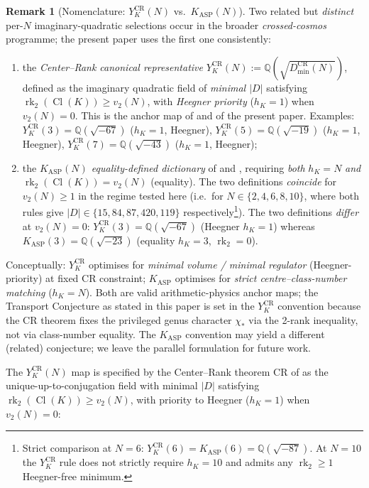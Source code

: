 \documentclass[11pt,a4paper,reqno]{amsart}
\theoremstyle{definition}
\newtheorem{remark}[theorem]{Remark}
\DeclareMathOperator{\Cl}{Cl}
\DeclareMathOperator{\rk}{rk}
\newcommand{\KASP}{K_{\mathrm{ASP}}}
\newcommand{\YKCR}{Y_K^{\mathrm{CR}}}
\newcommand{\QQ}{\mathbb{Q}}
\begin{document}
\begin{remark}[Nomenclature: $\YKCR(N)$ vs.\ $\KASP(N)$]\label{rem:nomen}
Two related but \emph{distinct} per-$N$ imaginary-quadratic selections occur in the broader \emph{crossed-cosmos} programme; the present paper uses the first one consistently:
\begin{enumerate}[label=(\arabic*),leftmargin=2em]
  \item the \emph{Center--Rank canonical representative} $\YKCR(N) := \QQ(\sqrt{D^{\mathrm{CR}}_{\min}(N)})$, defined as the imaginary quadratic field of \emph{minimal $|D|$} satisfying $\rk_2(\Cl(K))\ge v_2(N)$, with \emph{Heegner priority} ($h_K=1$) when $v_2(N)=0$. This is the anchor map of \cite{Remondiere2026CenterRank} and of the present paper. Examples: $\YKCR(3)=\QQ(\sqrt{-67})$ ($h_K=1$, Heegner), $\YKCR(5)=\QQ(\sqrt{-19})$ ($h_K=1$, Heegner), $\YKCR(7)=\QQ(\sqrt{-43})$ ($h_K=1$, Heegner);
  \item the \emph{$\KASP(N)$ equality-defined dictionary} of \cite{Remondiere2026KASPmini} and \cite{Remondiere2026PRL}, requiring \emph{both} $h_K=N$ \emph{and} $\rk_2(\Cl(K))=v_2(N)$ (equality). The two definitions \emph{coincide} for $v_2(N)\ge 1$ in the regime tested here (i.e.\ for $N\in\{2,4,6,8,10\}$, where both rules give $|D|\in\{15, 84, 87, 420, 119\}$ respectively\footnote{Strict comparison at $N=6$: $\YKCR(6)=\KASP(6)=\QQ(\sqrt{-87})$. At $N=10$ the $\YKCR$ rule does not strictly require $h_K=10$ and admits any $\rk_2\ge 1$ Heegner-free minimum.}). The two definitions \emph{differ} at $v_2(N)=0$: $\YKCR(3)=\QQ(\sqrt{-67})$ (Heegner $h_K=1$) whereas $\KASP(3)=\QQ(\sqrt{-23})$ (equality $h_K=3$, $\rk_2=0$).
\end{enumerate}
Conceptually: $\YKCR$ optimises for \emph{minimal volume / minimal regulator} (Heegner-priority) at fixed CR constraint; $\KASP$ optimises for \emph{strict centre--class-number matching} ($h_K=N$). Both are valid arithmetic-physics anchor maps; the Transport Conjecture as stated in this paper is set in the $\YKCR$ convention because the CR theorem fixes the privileged genus character $\chi_*$ via the 2-rank inequality, not via class-number equality. The $\KASP$ convention may yield a different (related) conjecture; we leave the parallel formulation for future work.
\end{remark}

The $\YKCR(N)$ map is specified by the Center--Rank theorem CR of \cite{Remondiere2026CenterRank} as the unique-up-to-conjugation field with minimal $|D|$ satisfying $\rk_2(\Cl(K))\ge v_2(N)$, with priority to Heegner ($h_K=1$) when $v_2(N)=0$:
\end{document}
